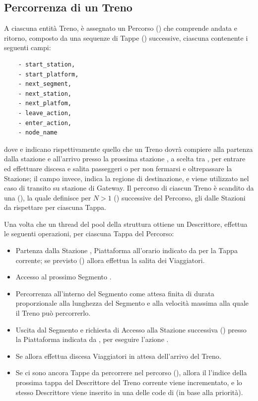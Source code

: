 	\subsection{Percorrenza di un Treno}
	
	A ciascuna entità Treno, è assegnato un Percorso () che comprende andata e ritorno, composto da una sequenze di Tappe () successive, ciascuna contenente i seguenti campi:
				\begin{center}
\begin{verbatim}
    - start_station,
    - start_platform,
    - next_segment,
    - next_station,
    - next_platfom,
    - leave_action,
    - enter_action,
    - node_name
\end{verbatim}
				\end{center}
dove  e  indicano rispettivamente quello che un Treno dovrà compiere alla partenza dalla stazione  e all'arrivo presso la prossima stazione , a scelta tra , per entrare ed effettuare discesa e salita passeggeri o  per non fermarsi e oltrepassare la Stazione; il campo  invece, indica la regione di destinazione, e viene utilizzato nel caso di transito su stazione di Gateway.
	Il percorso di ciascun Treno è scandito da una  (), la quale definisce per $N>1$  () successive del Percorso, gli  dalle Stazioni da rispettare per ciascuna Tappa. 
	 
Una volta che un thread del pool della struttura  ottiene un Descrittore, effettua le seguenti  operazioni, per ciascuna Tappa del Percorso:
				\begin{itemize} 
					\item Partenza dalla Stazione , Piattaforma  all'orario indicato da  per la Tappa corrente; se previsto () allora effettua la salita dei Viaggiatori.
					\item Accesso al prossimo Segmento .
					\item Percorrenza all'interno del Segmento come attesa finita di durata proporzionale alla lunghezza del Segmento e alla velocità massima alla quale il Treno può percorrerlo.
					\item Uscita dal Segmento e richiesta di Accesso alla Stazione successiva () presso la Piattaforma indicata da , per eseguire l'azione .
					\item Se  allora effettua discesa Viaggiatori in attesa dell'arrivo del Treno.
					\item Se ci sono ancora Tappe da percorrere nel percorso (), allora il l'indice della prossima tappa del Descrittore del Treno corrente viene incrementato, e lo stesso Descrittore viene inserito in una delle code di  (in base alla priorità). 
				\end{itemize}



